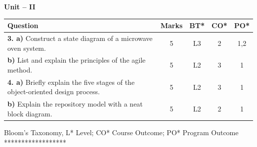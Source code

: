 \documentclass[12pt,a4paper]{article}
\begin{document}
\vspace{0.5cm}

\begin{center}
{\large \textbf{Unit -- II}}
\end{center}

\noindent
\begin{tabular}{|p{10.5cm}|c|c|c|c|}
\hline
\textbf{Question} & \textbf{Marks} & \textbf{BT*} & \textbf{CO*} & \textbf{PO*} \\
\hline
\textbf{3. a)} Construct a state diagram of a microwave oven system. & 5 & L3 & 2 & 1,2 \\
\hline
\textbf{b)} List and explain the principles of the agile method. & 5 & L2 & 3 & 1 \\
\hline
\textbf{4. a)} Briefly explain the five stages of the object-oriented design process. & 5 & L2 & 3 & 1 \\
\hline
\textbf{b)} Explain the repository model with a neat block diagram. & 5 & L2 & 2 & 1 \\
\hline
\end{tabular}

\vspace{0.5cm}
\begin{center}
\small{Bloom's Taxonomy, L* Level; CO* Course Outcome; PO* Program Outcome}\\[0.3cm]
******************
\end{center}
\end{document}
